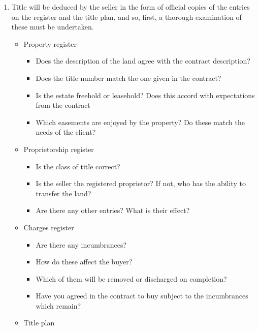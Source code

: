 \documentclass[
]{article}
\providecommand{\tightlist}{%
  \setlength{\itemsep}{0pt}\setlength{\parskip}{0pt}}
\begin{document}
\begin{enumerate}
\def\labelenumi{\arabic{enumi}.}
\tightlist
\item
  Title will be deduced by the seller in the form of official copies of
  the entries on the register and the title plan, and so, first, a
  thorough examination of these must be undertaken.

  \begin{itemize}
  \tightlist
  \item
    Property register

    \begin{itemize}
    \tightlist
    \item
      Does the description of the land agree with the contract
      description?
    \item
      Does the title number match the one given in the contract?
    \item
      Is the estate freehold or leasehold? Does this accord with
      expectations from the contract
    \item
      Which easements are enjoyed by the property? Do these match the
      needs of the client?
    \end{itemize}
  \item
    Proprietorship register

    \begin{itemize}
    \tightlist
    \item
      Is the class of title correct?
    \item
      Is the seller the registered proprietor? If not, who has the
      ability to transfer the land?
    \item
      Are there any other entries? What is their effect?
    \end{itemize}
  \item
    Charges register

    \begin{itemize}
    \tightlist
    \item
      Are there any incumbrances?
    \item
      How do these affect the buyer?
    \item
      Which of them will be removed or discharged on completion?
    \item
      Have you agreed in the contract to buy subject to the incumbrances
      which remain?
    \end{itemize}
  \item
    Title plan


\end{itemize}
\end{enumerate}
\end{document}
